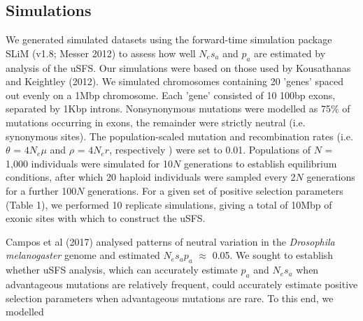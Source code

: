 \documentclass[11pt]{article}
\begin{document}
	\subsection*{Simulations}
	
	We generated simulated datasets using the forward-time simulation package SLiM (v1.8; Messer 2012) to assess how well $N_es_a$ and $p_a$ are estimated by analysis of the uSFS. Our simulations were based on those used by Kousathanas and Keightley (2012). We simulated chromosomes containing 20 'genes' spaced out evenly on a 1Mbp chromosome. Each 'gene' consisted of 10 100bp exons, separated by 1Kbp introns.  Nonsynonymous mutations were modelled as 75\% of mutations occurring in exons,  the remainder were strictly neutral (i.e. synonymous sites). The population-scaled mutation and recombination rates (i.e. $\theta$ = \emph{$4N_{e}\mu$} and $\rho$ = \emph{$4N_{e}r$}, respectively ) were set to 0.01. Populations of $N$ = 1,000 individuals were simulated for 10$N$ generations to establish equilibrium conditions, after which 20 haploid individuals were sampled every 2$N$ generations for a further 100$N$ generations. For a given set of positive selection parameters (Table 1), we performed 10 replicate simulations, giving a total of 10Mbp of exonic sites with which to construct the uSFS.
	
	Campos et al (2017) analysed patterns of neutral variation in the \textit{Drosophila melanogaster} genome and estimated $N_es_ap_a$ $\approx$ 0.05. We sought to establish whether uSFS analysis, which can accurately estimate $p_a$ and $N_es_a$ when advantageous mutations are relatively frequent, could accurately estimate positive selection parameters when advantageous mutations are rare. To this end, we modelled 

%

\end{document}

